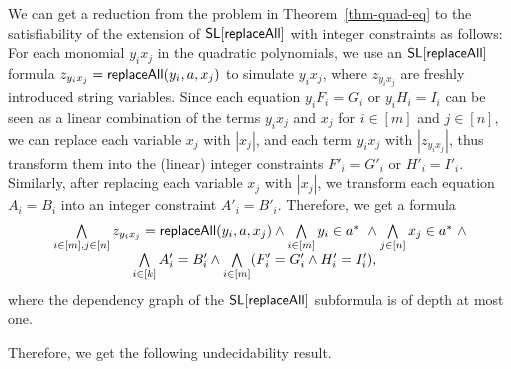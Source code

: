 We can get a reduction from the problem in Theorem~\ref{thm-quad-eq} to the satisfiability of the extension of $\mathsf{SL}[\mathsf{replaceAll}]$ with integer constraints as follows: For each monomial $y_i x_j$ in the quadratic polynomials, we use an $\mathsf{SL}[\mathsf{replaceAll}]$ formula $z_{y_i x_j} = \mathsf{replaceAll}(y_i, a, x_j)$ to simulate $y_i x_j$, where $z_{y_i x_j}$ are freshly introduced string variables. Since each equation $y_iF_i=G_i$ or $y_i H_i = I_i$ can be seen as a linear combination of the terms $y_i x_j$ and $x_j$ for $i \in [m]$ and $j \in [n]$, we can replace each variable $x_j$ with $|x_j|$, and each term $y_ix_j$ with $|z_{y_i x_j}|$,  thus transform them into the (linear) integer constraints $F'_i = G'_i$ or $H'_i = I'_i$. Similarly, after replacing each variable $x_j$ with $|x_j|$, we transform each equation $A_i= B_i$ into an integer constraint $A'_i = B'_i$. Therefore, we get a formula 
$$
\begin{array}{l c l }
\bigwedge \limits_{i \in [m], j \in [n]} z_{y_i x_j} = \replaceall(y_i, a, x_j) \wedge \bigwedge \limits_{i \in [m]} y_i \in a^*\ \wedge  \bigwedge \limits_{j \in [n]} x_j \in a^* \  \wedge\\
 \hspace{2cm} \bigwedge \limits_{i \in [k]} A'_i = B'_i \wedge \bigwedge \limits_{i \in [m]} (F'_i = G'_i \wedge H'_i = I'_i),
 \end{array}
$$
where the dependency graph of the $\mathsf{SL}[\mathsf{replaceAll}]$ subformula is of depth at most one.


Therefore, we get the following undecidability result.

